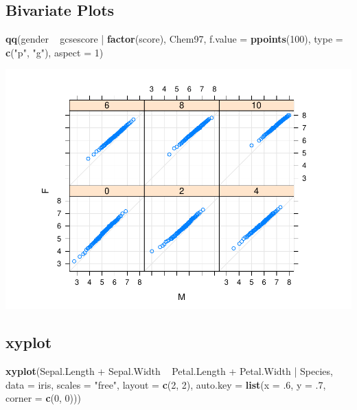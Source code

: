 \documentclass[]{article}
\newenvironment{Shaded}{\begin{snugshade}}{\end{snugshade}}
\newcommand{\KeywordTok}[1]{\textcolor[rgb]{0.13,0.29,0.53}{\textbf{{#1}}}}
\newcommand{\DataTypeTok}[1]{\textcolor[rgb]{0.13,0.29,0.53}{{#1}}}
\newcommand{\DecValTok}[1]{\textcolor[rgb]{0.00,0.00,0.81}{{#1}}}
\newcommand{\StringTok}[1]{\textcolor[rgb]{0.31,0.60,0.02}{{#1}}}
\newcommand{\NormalTok}[1]{{#1}}
\begin{document}
\subsection{Bivariate Plots}\label{bivariate-plots}

\begin{Shaded}
\begin{Highlighting}[]
\KeywordTok{qq}\NormalTok{(gender ~}\StringTok{ }\NormalTok{gcsescore |}\StringTok{ }\KeywordTok{factor}\NormalTok{(score), Chem97,}
   \DataTypeTok{f.value =} \KeywordTok{ppoints}\NormalTok{(}\DecValTok{100}\NormalTok{), }\DataTypeTok{type =} \KeywordTok{c}\NormalTok{(}\StringTok{"p"}\NormalTok{, }\StringTok{"g"}\NormalTok{), }\DataTypeTok{aspect =} \DecValTok{1}\NormalTok{)}
\end{Highlighting}
\end{Shaded}

\includegraphics{Intro_Datenanalyse1_files/figure-latex/unnamed-chunk-178-1.pdf}

\subsection{xyplot}\label{xyplot}

\begin{Shaded}
\begin{Highlighting}[]
\KeywordTok{xyplot}\NormalTok{(Sepal.Length +}\StringTok{ }\NormalTok{Sepal.Width ~}\StringTok{ }\NormalTok{Petal.Length +}\StringTok{ }\NormalTok{Petal.Width |}\StringTok{ }\NormalTok{Species,}
       \DataTypeTok{data =} \NormalTok{iris, }\DataTypeTok{scales =} \StringTok{"free"}\NormalTok{, }\DataTypeTok{layout =} \KeywordTok{c}\NormalTok{(}\DecValTok{2}\NormalTok{, }\DecValTok{2}\NormalTok{),}
       \DataTypeTok{auto.key =} \KeywordTok{list}\NormalTok{(}\DataTypeTok{x =} \NormalTok{.}\DecValTok{6}\NormalTok{, }\DataTypeTok{y =} \NormalTok{.}\DecValTok{7}\NormalTok{, }\DataTypeTok{corner =} \KeywordTok{c}\NormalTok{(}\DecValTok{0}\NormalTok{, }\DecValTok{0}\NormalTok{)))}
\end{Highlighting}
\end{Shaded}
\end{document}
